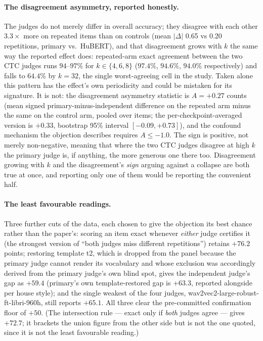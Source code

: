 \documentclass[11pt]{article}
\begin{document}
\paragraph{The disagreement asymmetry, reported honestly.} The judges do not
merely differ in overall accuracy; they disagree with each other $3.3\times$
more on repeated items than on controls (mean $|\Delta|$ 0.65 vs 0.20
repetitions, primary vs.\ HuBERT), and that disagreement grows with $k$ the
same way the reported effect does: repeated-arm exact agreement between the
two CTC judges runs $94$--$97\%$ for $k\in\{4,6,8\}$ ($97.4\%$, $94.6\%$,
$94.0\%$ respectively) and falls to $64.4\%$ by $k{=}32$, the single
worst-agreeing cell in the study. Taken alone this pattern has the effect's
own periodicity and could be mistaken for its signature. It is not: the
disagreement asymmetry statistic is $A = +0.27$ counts (mean signed
primary-minus-independent difference on the repeated arm minus the same on
the control arm, pooled over items; the per-checkpoint-averaged version is
$+0.33$, bootstrap 95\% interval $[-0.09, +0.73]$), and the confound
mechanism the objection describes requires $A\le-1.0$. The sign is positive,
not merely non-negative, meaning that where the two CTC judges disagree at
high $k$ the primary judge is, if anything, the more generous one there too.
Disagreement growing with $k$ and the disagreement's \emph{sign} arguing
against a collapse are both true at once, and reporting only one of them
would be reporting the convenient half.

\paragraph{The least favourable readings.} Three further cuts of the data,
each chosen to give the objection its best chance rather than the paper's:
scoring an item exact whenever \emph{either} judge certifies it (the
strongest version of ``both judges miss different repetitions'') retains
$+76.2$ points; restoring template t2, which is dropped from the panel
because the primary judge cannot render its vocabulary and whose exclusion
was accordingly derived from the primary judge's own blind spot, gives the
independent judge's gap as $+59.4$ (primary's own template-restored gap is
$+63.3$, reported alongside per house style); and the single weakest of the
four judges, wav2vec2-large-robust-ft-libri-960h, still reports $+65.1$. All
three clear the pre-committed confirmation floor of $+50$. (The intersection
rule --- exact only if \emph{both} judges agree --- gives $+72.7$; it
brackets the union figure from the other side but is not the one quoted,
since it is not the least favourable reading.)
\end{document}
